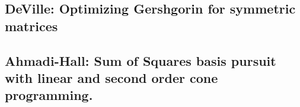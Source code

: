 \subsection{DeVille: Optimizing Gershgorin for symmetric matrices \cite{deville_optimizing_2019}}
\label{sec:deville_optimizing_gershgorin}


\subsection{Ahmadi-Hall: Sum of Squares basis pursuit with linear and second order cone programming. \cite{ahmadi_sum_2015}}
\label{sec:ahmadi_sos_basis_optimitazion}
